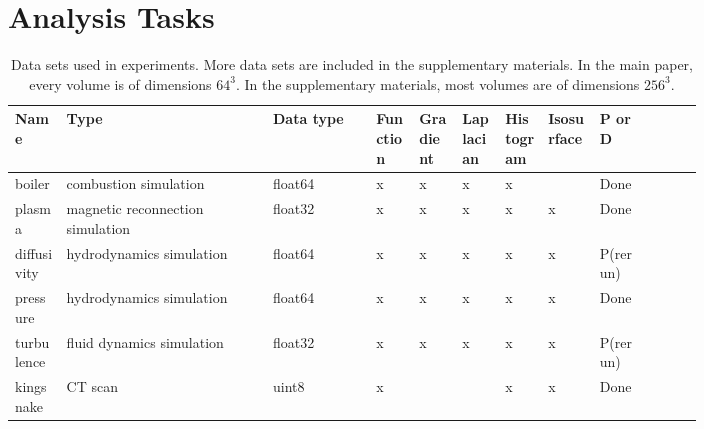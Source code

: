 \section{ Analysis Tasks}\label{sec:analysis-tasks}

\begin{table*}[t] 
	\caption{Data sets used in experiments. More data sets are included in the
	supplementary materials. In the main paper, every volume is of dimensions $64^3$. In the 
	supplementary materials, most volumes are of dimensions $256^3$.}
  \centering
  \begin{tabular}{p{0.06\linewidth}p{0.24\linewidth}p{0.12\linewidth}p{0.05\linewidth}p{0.05\linewidth}p{0.05\linewidth}p{0.05\linewidth}p{0.06\linewidth}p{0.06\linewidth}p{0.06\linewidth}}
  \hline
  Name & Type & Data type & Function & Gradient & Laplacian & Histogram & Isosurface & P or D\\
  \hline
  boiler & combustion simulation& float64 & x & x & x & x &  & Done \\
  plasma & magnetic reconnection simulation& float32 & x & x & x & x & x & Done\\
  diffusivity & hydrodynamics simulation& float64 & x & x & x & x & x & P(rerun)\\
  pressure & hydrodynamics simulation& float64 & x & x & x & x & x & Done\\
	turbulence & fluid dynamics simulation& float32 & x & x & x & x & x &	P(rerun)\\
	kingsnake & CT scan & uint8 & x &  &  & x & x & Done\\
  \hline
  \end{tabular}\label{tbl:data-sets}
\end{table*}

